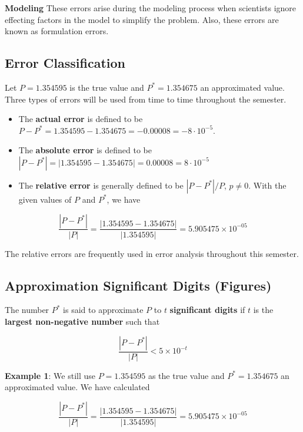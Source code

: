 \documentclass[
]{book}
\begin{document}
\textbf{Modeling} These errors arise during the modeling process when scientists ignore effecting factors in the model to simplify the problem. Also, these errors are known as formulation errors.

\hypertarget{error-classification}{%
\subsection{Error Classification}\label{error-classification}}

Let \(P = 1.354595\) is the true value and \(P^* = 1.354675\) an approximated value. Three types of errors will be used from time to time throughout the semester.

\begin{itemize}
\item
  The \textbf{actual error} is defined to be \(P-P^* = 1.354595-1.354675 = -0.00008 = -8 \cdot 10^{-5}\).
\item
  The \textbf{absolute error} is defined to be \(|P-P^*| = |1.354595 - 1.354675| = 0.00008 = 8 \cdot 10^{-5}\)
\item
  The \textbf{relative error} is generally defined to be \(|P-P^*|/P\), \(p \ne 0\). With the given values of \(P\) and \(P^*\), we have
\end{itemize}

\[
\frac{|P-P^*|}{|P|} = \frac{|1.354595 - 1.354675|}{|1.354595|} = 5.905475\times 10^{-05}
\]

The relative errors are frequently used in error analysis throughout this semester.

\hypertarget{approximation-significant-digits-figures}{%
\subsection{Approximation Significant Digits (Figures)}\label{approximation-significant-digits-figures}}

The number \(P^*\) is said to approximate \(P\) to \(t\) \textbf{significant digits} if \(t\) is the \textbf{\color{red}largest non-negative number} such that

\[
\frac{|P-P^*|}{|P|} < 5\times 10^{-t}
\]

\textbf{Example 1}: We still use \(P = 1.354595\) as the true value and \(P^* = 1.354675\) an approximated value. We have calculated

\[
\frac{|P-P^*|}{|P|} = \frac{|1.354595-1.354675|}{|1.354595|} = 5.905475\times 10^{-05}
\]
\end{document}
